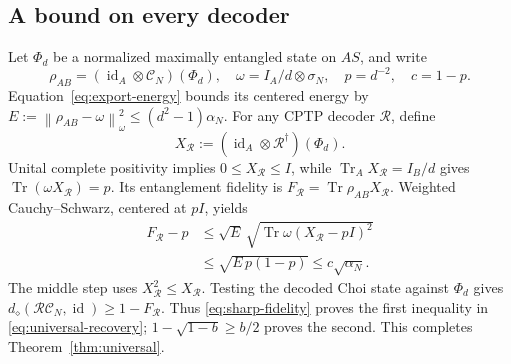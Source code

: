 \documentclass[11pt]{article}
\numberwithin{equation}{section}
\theoremstyle{remark}
\newcommand{\Tr}{\operatorname{Tr}}
\newcommand{\id}{\operatorname{id}}
\newcommand{\Ccal}{\mathcal C}
\newcommand{\norm}[1]{\left\lVert#1\right\rVert}
\begin{document}
\subsection{A bound on every decoder}
\label{sec:decoder-converse}
Let \(\Phi_d\) be a normalized maximally entangled state on \(AS\), and write
\[
 \rho_{AB}=(\id_A\otimes\Ccal_N)(\Phi_d),\quad
 \omega=I_A/d\otimes\sigma_N,\quad p=d^{-2},\quad c=1-p.
\]
Equation~\eqref{eq:export-energy} bounds its centered energy by
\(E:=\norm{\rho_{AB}-\omega}_\omega^2\le(d^2-1)\alpha_N\).
For any CPTP decoder \(\mathcal R\), define
\[
 X_{\mathcal R}:=(\id_A\otimes\mathcal R^\dagger)(\Phi_d).
\]
Unital complete positivity implies \(0\le X_{\mathcal R}\le I\), while
\(\Tr_A X_{\mathcal R}=I_B/d\) gives
\(\Tr(\omega X_{\mathcal R})=p\).
Its entanglement fidelity is \(F_{\mathcal R}=\Tr\rho_{AB}X_{\mathcal R}\).
Weighted Cauchy--Schwarz, centered at \(pI\), yields
\begin{align}
 F_{\mathcal R}-p
 &\le \sqrt E\,
       \sqrt{\Tr\omega(X_{\mathcal R}-pI)^2}\\
 &\le \sqrt{E\,p(1-p)}
 \le c\sqrt{\alpha_N}.                       \label{eq:sharp-fidelity}
\end{align}
The middle step uses \(X_{\mathcal R}^2\le X_{\mathcal R}\).
Testing the decoded Choi state against \(\Phi_d\) gives
\(d_\diamond(\mathcal R\Ccal_N,\id)\ge1-F_{\mathcal R}\).
Thus \eqref{eq:sharp-fidelity} proves the first inequality in
\eqref{eq:universal-recovery}; \(1-\sqrt{1-b}\ge b/2\) proves the second.
This completes Theorem~\ref{thm:universal}.
\end{document}
